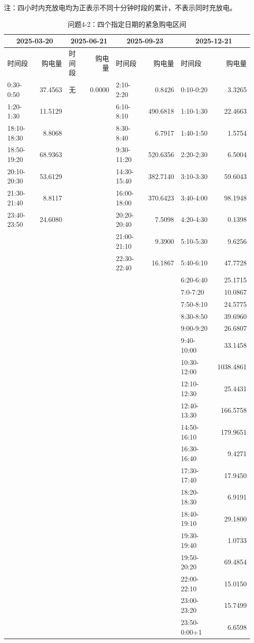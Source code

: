 \raggedright 注：四小时内充放电均为正表示不同十分钟时段的累计，不表示同时充放电。\par\endgroup
\begin{table}[H]\centering\caption{问题4-2：四个指定日期的紧急购电区间}\label{tab:emergency-问题4-2}\fontsize{9}{11}\selectfont\setlength{\tabcolsep}{2pt}\begin{tabular}{|lr|lr|lr|lr|}\hline
\multicolumn{2}{|c|}{2025-03-20} & \multicolumn{2}{|c|}{2025-06-21} & \multicolumn{2}{|c|}{2025-09-23} & \multicolumn{2}{|c|}{2025-12-21}\\\hline
时间段&购电量&时间段&购电量&时间段&购电量&时间段&购电量\\\hline
0:30-0:50 & 37.4563 & 无 & 0.0000 & 2:10-2:20 & 0.8426 & 0:10-0:20 & 3.3265\\
1:20-1:30 & 11.5129 &  &  & 6:10-8:10 & 490.6818 & 1:10-1:30 & 22.4663\\
18:10-18:30 & 8.8068 &  &  & 8:30-8:40 & 6.7917 & 1:40-1:50 & 1.5754\\
18:50-19:20 & 68.9363 &  &  & 9:30-11:20 & 520.6356 & 2:20-2:30 & 6.5004\\
20:10-20:30 & 53.6129 &  &  & 14:30-15:40 & 382.7140 & 3:10-3:30 & 59.6043\\
21:30-21:40 & 8.8117 &  &  & 16:00-18:00 & 370.6423 & 3:40-4:00 & 98.1948\\
23:40-23:50 & 24.6080 &  &  & 20:20-20:40 & 7.5098 & 4:20-4:30 & 0.1398\\
 &  &  &  & 21:00-21:10 & 9.3900 & 5:10-5:30 & 9.6256\\
 &  &  &  & 22:30-22:40 & 16.1867 & 5:40-6:10 & 47.7728\\
 &  &  &  &  &  & 6:20-6:40 & 25.1715\\
 &  &  &  &  &  & 7:0-7:20 & 10.0867\\
 &  &  &  &  &  & 7:50-8:10 & 24.5775\\
 &  &  &  &  &  & 8:30-8:50 & 39.6960\\
 &  &  &  &  &  & 9:00-9:20 & 26.6807\\
 &  &  &  &  &  & 9:40-10:00 & 33.1458\\
 &  &  &  &  &  & 10:30-12:00 & 1038.4861\\
 &  &  &  &  &  & 12:10-12:30 & 25.4431\\
 &  &  &  &  &  & 12:40-13:30 & 166.5758\\
 &  &  &  &  &  & 14:50-16:10 & 179.9651\\
 &  &  &  &  &  & 16:30-16:40 & 9.4271\\
 &  &  &  &  &  & 17:30-17:40 & 17.9450\\
 &  &  &  &  &  & 18:20-18:30 & 6.9191\\
 &  &  &  &  &  & 18:40-19:10 & 29.1800\\
 &  &  &  &  &  & 19:30-19:40 & 1.0733\\
 &  &  &  &  &  & 19:50-20:20 & 69.4854\\
 &  &  &  &  &  & 22:00-22:10 & 15.0150\\
 &  &  &  &  &  & 23:00-23:20 & 15.7499\\
 &  &  &  &  &  & 23:50-0:00+1 & 6.6598\\
\hline\end{tabular}\end{table}

